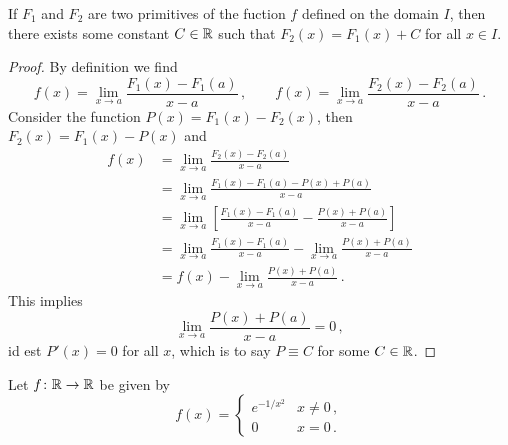 \documentclass[week=6]{homework}
\begin{document}
\begin{questions}
	    \begin{toprove}
	    	If $F_1$ and $F_2$ are two primitives of the fuction $f$ defined on the domain $I$, then there exists some constant $C \in \mathbb{R}$ such that $F_2(x) = F_1(x) + C$ for all $x \in I$.
	    \end{toprove}
	    \begin{proof}
	    	By definition we find
	    	\[
		    	f(x) = \lim_{x\to a}\frac{F_1(x)-F_1(a)}{x-a}\,,\qquad f(x) = \lim_{x\to a}\frac{F_2(x)-F_2(a)}{x-a}\,.
	    	\]
	    	Consider the function $P(x) = F_1(x)-F_2(x)$, then $F_2(x) = F_1(x) - P(x)$ and
	    	\begin{align*}
			   	f(x) &= \lim_{x\to a}\frac{F_2(x)-F_2(a)}{x-a} \\
				   	&= \lim_{x\to a}\frac{F_1(x)  - F_1(a) - P(x) + P(a)}{x-a} \\
				   	&= \lim_{x\to a}\left[\frac{F_1(x)  - F_1(a)}{x-a} - \frac{P(x) + P(a)}{x-a}\right] \\
				   	&= \lim_{x\to a}\frac{F_1(x)  - F_1(a)}{x-a} - \lim_{x\to a}\frac{P(x) + P(a)}{x-a} \\
				   	&= f(x) - \lim_{x\to a}\frac{P(x) + P(a)}{x-a}\,.
	    	\end{align*}
	    	This implies
	    	\[
		    	\lim_{x\to a}\frac{P(x) + P(a)}{x-a} = 0\,,
	    	\]
	    	id est $P'(x) = 0$ for all $x$, which is to say $P \equiv C$ for some $C \in \mathbb{R}$. 
	    \end{proof}
	    
	    \question
	    Let $f \colon \mathbb{R} \to \mathbb{R}$ be given by
	    \[
		    f(x) = \begin{cases} e^{-1/x^2} & x\neq 0\,, \\ 0 & x = 0\,. \end{cases}
	    \]
\end{questions}
\end{document}
